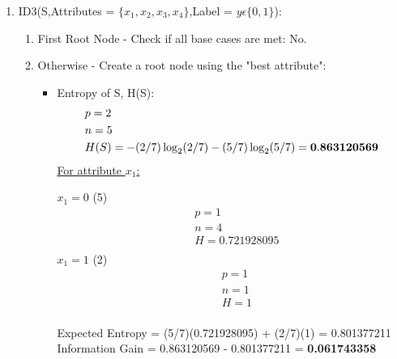 \documentclass[8pt, fullpage,letterpaper]{article}
\begin{document}
\begin{enumerate}
\begin{enumerate}
\begin{enumerate}
	 	\item ID3(S,Attributes = $\{x_1, x_2, x_3, x_4\}$,Label = $y \epsilon \{0, 1\}$): 
			\begin{enumerate}
			\item First Root Node - Check if all base cases are met: {\color{red} No}.
			\item Otherwise - Create a root node using the "best attribute":
				\begin{itemize}
					\item Entropy of S, H(S):
						\begin{align*}
						    	& p = 2\\
							& n = 5 \\
						    	& H(S) = - (2/7) \log_2 (2/7) - (5/7) \log_2 (5/7) = {\bf 0.863120569}
					      \end{align*}
						\underline {For attribute $x_1$:} 
							\vspace{-5pt}
							\begin{multicols}{2}
								$x_1=0$ (5)
			 						\begin{align*}
									    	& p = 1\\
										& n = 4 \\
									    	& H = 0.721928095\\
								      \end{align*}
								$x_1=1$ (2)
			 						\begin{align*}
									    	& p = 1\\
										& n = 1 \\
									    	& H = 1\\
								      \end{align*}
							\end{multicols}
							\vspace{-20pt}
							Expected Entropy = (5/7)(0.721928095) + (2/7)(1) = 0.801377211\\
							Information Gain = 0.863120569 - 0.801377211 = {\bf 0.061743358}\\


\end{itemize}
\end{enumerate}
\end{enumerate}
\end{enumerate}
\end{enumerate}
\end{document}
